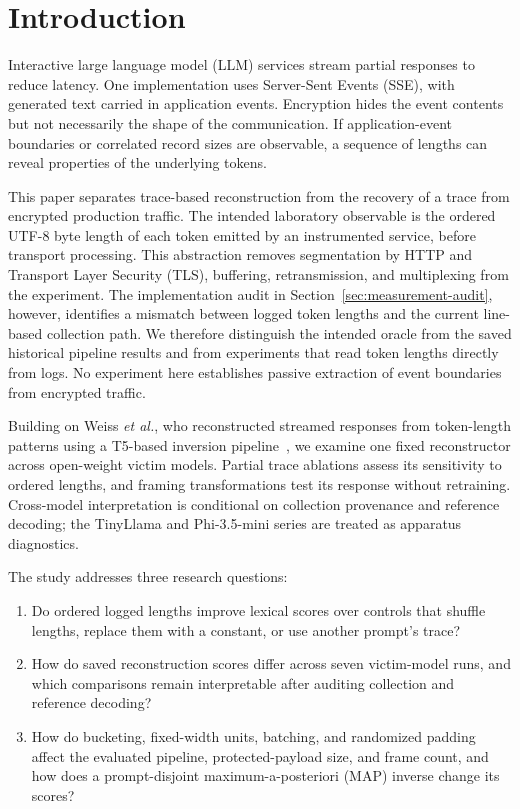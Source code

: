 \documentclass[electronics,article,submit,pdftex,moreauthors]{Definitions/mdpi}
\begin{document}
\section{Introduction}
Interactive large language model (LLM) services stream partial responses to reduce latency. One implementation uses Server-Sent Events (SSE), with generated text carried in application events. Encryption hides the event contents but not necessarily the shape of the communication. If application-event boundaries or correlated record sizes are observable, a sequence of lengths can reveal properties of the underlying tokens.

This paper separates trace-based reconstruction from the recovery of a trace from encrypted production traffic. The intended laboratory observable is the ordered UTF-8 byte length of each token emitted by an instrumented service, before transport processing. This abstraction removes segmentation by HTTP and Transport Layer Security (TLS), buffering, retransmission, and multiplexing from the experiment. The implementation audit in Section~\ref{sec:measurement-audit}, however, identifies a mismatch between logged token lengths and the current line-based collection path. We therefore distinguish the intended oracle from the saved historical pipeline results and from experiments that read token lengths directly from logs. No experiment here establishes passive extraction of event boundaries from encrypted traffic.

Building on Weiss \emph{et al.}, who reconstructed streamed responses from token-length patterns using a T5-based inversion pipeline~\cite{weiss2024prompt}, we examine one fixed reconstructor across open-weight victim models. Partial trace ablations assess its sensitivity to ordered lengths, and framing transformations test its response without retraining. Cross-model interpretation is conditional on collection provenance and reference decoding; the TinyLlama and Phi-3.5-mini series are treated as apparatus diagnostics.

The study addresses three research questions:
\begin{enumerate}[label=\textbf{RQ\arabic*:},leftmargin=4.2em,labelwidth=3.2em,labelsep=0.6em]
    \item Do ordered logged lengths improve lexical scores over controls that shuffle lengths, replace them with a constant, or use another prompt's trace?
    \item How do saved reconstruction scores differ across seven victim-model runs, and which comparisons remain interpretable after auditing collection and reference decoding?
    \item How do bucketing, fixed-width units, batching, and randomized padding affect the evaluated pipeline, protected-payload size, and frame count, and how does a prompt-disjoint maximum-a-posteriori (MAP) inverse change its scores?
\end{enumerate}
\end{document}
